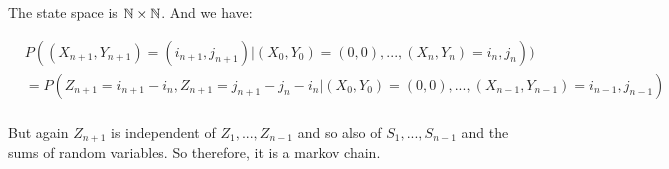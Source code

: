
The state space is $\Bbb N \times \Bbb N$. And we have:

\begin{align*}
&P((X_{n+1},Y_{n+1}) =(i_{n+1},j_{n+1})| (X_0,Y_0)=(0,0),...,(X_n,Y_n)=i_n,j_n)) \\&= P(Z_{n+1}=i_{n+1}-i_n,Z_{n+1}=j_{n+1}-j_{n}-i_n | (X_0,Y_0)=(0,0),...,(X_{n-1},Y_{n-1})=i_{n-1},j_{n-1}) \\
\end{align*}

But again $Z_{n+1}$ is independent of $Z_1,...,Z_{n-1}$ and so also of $S_1,...,S_{n-1}$ and the sums of random variables. So therefore, it is a markov chain. 